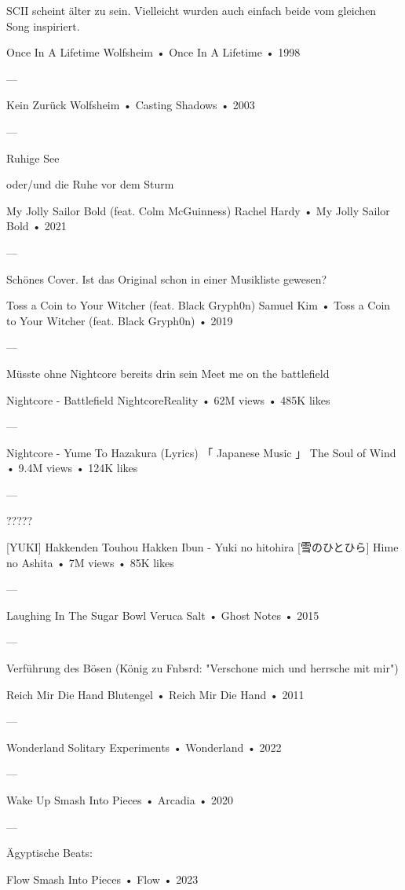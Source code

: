 SCII scheint älter zu sein. Vielleicht wurden auch einfach beide vom gleichen Song inspiriert.

Once In A Lifetime
Wolfsheim
 •
Once In A Lifetime
 •
1998


—

Kein Zurück
Wolfsheim
 •
Casting Shadows
 •
2003

—

Ruhige See

oder/und die Ruhe vor dem Sturm

My Jolly Sailor Bold (feat. Colm McGuinness)
Rachel Hardy
 •
My Jolly Sailor Bold
 •
2021


—

Schönes Cover. Ist das Original schon in einer Musikliste gewesen?

Toss a Coin to Your Witcher (feat. Black Gryph0n)
Samuel Kim
 •
Toss a Coin to Your Witcher (feat. Black Gryph0n)
 •
2019



—

Müsste ohne Nightcore bereits drin sein
Meet me on the battlefield


Nightcore - Battlefield
NightcoreReality
 •
62M views
 •
485K likes


—

Nightcore - Yume To Hazakura (Lyrics) 「 Japanese Music 」
The Soul of Wind
 •
9.4M views
 •
124K likes



—

?????

[YUKI] Hakkenden Touhou Hakken Ibun - Yuki no hitohira [雪のひとひら]
Hime no Ashita
 •
7M views
 •
85K likes


—

Laughing In The Sugar Bowl
Veruca Salt
 •
Ghost Notes
 •
2015

—

Verführung des Bösen (König zu Fnbsrd: "Verschone mich und herrsche mit mir")

Reich Mir Die Hand
Blutengel
 •
Reich Mir Die Hand
 •
2011

—

Wonderland
Solitary Experiments
 •
Wonderland
 •
2022

—

Wake Up
Smash Into Pieces
 •
Arcadia
 •
2020

—

Ägyptische Beats:

Flow
Smash Into Pieces
 •
Flow
 •
2023

